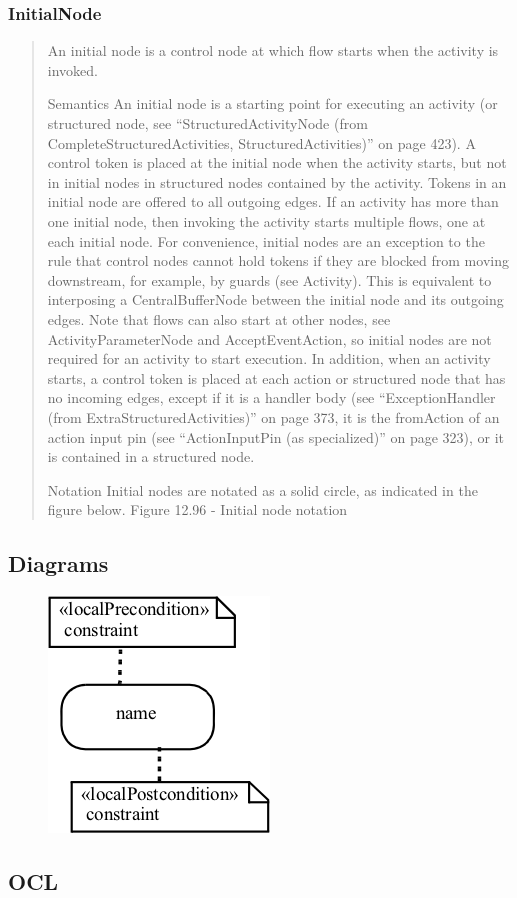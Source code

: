 \subsubsection{InitialNode}
\begin{quotation}
An initial node is a control node at which flow starts when the activity is invoked.

Semantics
An initial node is a starting point for executing an activity (or structured node, see “StructuredActivityNode (from
CompleteStructuredActivities, StructuredActivities)” on page 423). A control token is placed at the initial node when the
activity starts, but not in initial nodes in structured nodes contained by the activity. Tokens in an initial node are offered
to all outgoing edges. If an activity has more than one initial node, then invoking the activity starts multiple flows, one at
each initial node. For convenience, initial nodes are an exception to the rule that control nodes cannot hold tokens if they
are blocked from moving downstream, for example, by guards (see Activity). This is equivalent to interposing a
CentralBufferNode between the initial node and its outgoing edges.
Note that flows can also start at other nodes, see ActivityParameterNode and AcceptEventAction, so initial nodes are not
required for an activity to start execution. In addition, when an activity starts, a control token is placed at each action or
structured node that has no incoming edges, except if it is a handler body (see “ExceptionHandler (from
ExtraStructuredActivities)” on page 373, it is the fromAction of an action input pin (see “ActionInputPin (as specialized)”
on page 323), or it is contained in a structured node.

Notation
Initial nodes are notated as a solid circle, as indicated in the figure below.
Figure 12.96 - Initial node notation


\end{quotation}

\subsection{Diagrams}
\begin{figure}
\includegraphics[scale=1]{./pics/local_postconditionsDiagram.PNG}
\end{figure}
\subsection{OCL}
